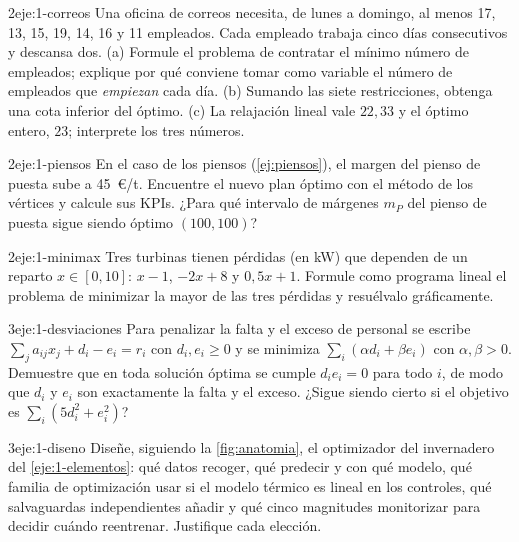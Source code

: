 \begin{ejercicio}{2}{eje:1-correos}
Una oficina de correos necesita, de lunes a domingo, al menos 17, 13, 15, 19, 14, 16 y 11 empleados. Cada empleado trabaja cinco días consecutivos y descansa dos. (a) Formule el problema de contratar el mínimo número de empleados; explique por qué conviene tomar como variable el número de empleados que \emph{empiezan} cada día. (b) Sumando las siete restricciones, obtenga una cota inferior del óptimo. (c) La relajación lineal vale $22{,}33$ y el óptimo entero, $23$; interprete los tres números.
\end{ejercicio}

\begin{ejercicio}{2}{eje:1-piensos}
En el caso de los piensos (\cref{ej:piensos}), el margen del pienso de puesta sube a 45~€/t. Encuentre el nuevo plan óptimo con el método de los vértices y calcule sus KPIs. ¿Para qué intervalo de márgenes $m_P$ del pienso de puesta sigue siendo óptimo $(100,100)$?
\end{ejercicio}

\begin{ejercicio}{2}{eje:1-minimax}
Tres turbinas tienen pérdidas (en kW) que dependen de un reparto $x\in[0,10]$: $x-1$, $-2x+8$ y $0{,}5x+1$. Formule como programa lineal el problema de minimizar la mayor de las tres pérdidas y resuélvalo gráficamente.
\end{ejercicio}

\begin{ejercicio}{3}{eje:1-desviaciones}
Para penalizar la falta y el exceso de personal se escribe $\sum_j a_{ij}x_j+d_i-e_i=r_i$ con $d_i,e_i\ge 0$ y se minimiza $\sum_i(\alpha d_i+\beta e_i)$ con $\alpha,\beta>0$. Demuestre que en toda solución óptima se cumple $d_ie_i=0$ para todo $i$, de modo que $d_i$ y $e_i$ son exactamente la falta y el exceso. ¿Sigue siendo cierto si el objetivo es $\sum_i(5d_i^{2}+e_i^{2})$?
\end{ejercicio}

\begin{ejercicio}{3}{eje:1-diseno}
Diseñe, siguiendo la \cref{fig:anatomia}, el optimizador del invernadero del \cref{eje:1-elementos}: qué datos recoger, qué predecir y con qué modelo, qué familia de optimización usar si el modelo térmico es lineal en los controles, qué salvaguardas independientes añadir y qué cinco magnitudes monitorizar para decidir cuándo reentrenar. Justifique cada elección.
\end{ejercicio}
